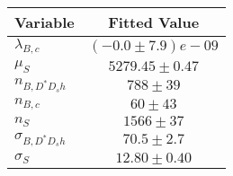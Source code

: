 \begin{tabular}[t]{lc}
\hline
Variable &Fitted Value\\
\hline\hline
$\lambda_{B,c}$&$(-0.0\pm7.9)e-09$\\
\hline
$\mu_S$&$5279.45\pm0.47$\\
\hline
$n_{B, D^* D_s h}$&$788\pm39$\\
\hline
$n_{B,c}$&$60\pm43$\\
\hline
$n_S$&$1566\pm37$\\
\hline
$\sigma_{B, D^* D_s h}$&$70.5\pm2.7$\\
\hline
$\sigma_S$&$12.80\pm0.40$\\
\hline
\end{tabular}
